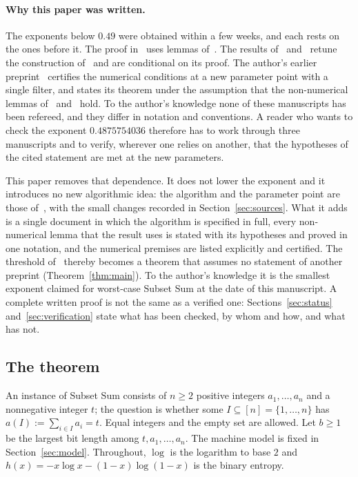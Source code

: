 \documentclass[11pt]{article}
\theoremstyle{definition}
\begin{document}
\paragraph{Why this paper was written.} The exponents below $0.49$ were obtained within a few weeks, and each rests
on the ones before it. The proof in~\cite{Base} uses lemmas of~\cite{OAI}. The results of~\cite{W} and~\cite{B}
retune the construction of~\cite{Base} and are conditional on its proof. The author's earlier preprint~\cite{V}
certifies the numerical conditions at a new parameter point with a single filter, and states its theorem under the
assumption that the non-numerical lemmas of~\cite{OAI} and~\cite{Base} hold. To the author's knowledge none of
these manuscripts has been refereed, and they differ in notation and conventions. A reader who wants to check the
exponent $0.4875754036$ therefore has to work through three manuscripts and to verify, wherever one relies on
another, that the hypotheses of the cited statement are met at the new parameters.

This paper removes that dependence. It does not lower the exponent and it introduces no new algorithmic idea: the
algorithm and the parameter point are those of~\cite{V}, with the small changes recorded in
Section~\ref{sec:sources}. What it adds is a single document in which the algorithm is specified in full, every
non-numerical lemma that the result uses is stated with its hypotheses and proved in one notation, and the numerical
premises are listed explicitly and certified. The threshold of~\cite{V} thereby becomes a theorem that assumes no
statement of another preprint (Theorem~\ref{thm:main}). To the author's knowledge it is the smallest exponent
claimed for worst-case Subset Sum at the date of this manuscript. A complete written proof is not the same as a
verified one: Sections~\ref{sec:status} and~\ref{sec:verification} state what has been checked, by whom and how, and what
has not.

\subsection{The theorem}
An instance of Subset Sum consists of $n\ge2$ positive integers $a_1,\dots,a_n$ and a nonnegative integer $t$; the
question is whether some $I\subseteq[n]=\{1,\dots,n\}$ has $a(I):=\sum_{i\in I}a_i=t$. Equal integers and the empty
set are allowed. Let $b\ge1$ be the largest bit length among $t,a_1,\dots,a_n$. The machine model is fixed in
Section~\ref{sec:model}. Throughout, $\log$ is the logarithm to base $2$ and
$h(x)=-x\log x-(1-x)\log(1-x)$ is the binary entropy.
\end{document}
